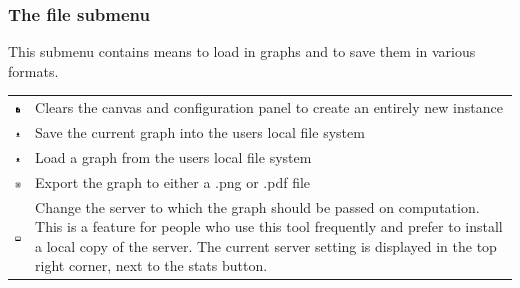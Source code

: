 \subsubsection{The file submenu}
This submenu contains means to load in graphs and to save them in various formats.
\begin{tabular}{p{}p{}}
\includegraphics[scale=0.6]{figures/icons/new.png} & Clears the canvas and configuration panel to create an entirely new instance\\
\includegraphics[scale=0.6]{figures/icons/download.png}& Save the current graph into the users local file system\\
\includegraphics[scale=0.6]{figures/icons/upload.png}& Load a graph from the users local file system\\
\includegraphics[scale=0.6]{figures/icons/export.png}& Export the graph to either a .png or .pdf file\\
\includegraphics[scale=0.6]{figures/icons/server.png} &Change the server to which the graph should be passed on computation. This is a feature for people who use this tool frequently and prefer to install a local copy of the server. The current server setting is displayed in the top right corner, next to the stats button. 
\end{tabular}

